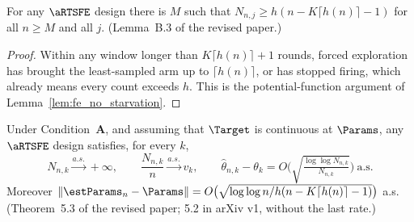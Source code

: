 \begin{lemma}\label{lem:fe_lower_bound}
\leanok
{}
For any $\aRTSFE$ design there is $M$ such that $N_{n,j}\ge h(n-K\lceil h(n)\rceil-1)$ for all
$n\ge M$ and all $j$. (Lemma~B.3 of the revised paper.)
\end{lemma}

\begin{proof}\leanok
Within any window longer than $K\lceil h(n)\rceil+1$ rounds, forced exploration has brought the
least-sampled arm up to $\lceil h(n)\rceil$, or has stopped firing, which already means every
count exceeds $h$. This is the potential-function argument of
Lemma~\ref{lem:fe_no_starvation}.
\end{proof}

\begin{theorem}\label{thm:sparse_rate}
\leanok
{}
Under Condition~\textbf{A}, and assuming that $\Target$ is continuous at $\Params$, any $\aRTSFE$
design satisfies, for every $k$,
\[
  N_{n,k}\xrightarrow{a.s.}+\infty,\qquad
  \frac{N_{n,k}}{n}\xrightarrow{a.s.}v_k,\qquad
  \hat\theta_{n,k}-\theta_k = O\!\Big(\sqrt{\tfrac{\log\log N_{n,k}}{N_{n,k}}}\Big)\ \text{a.s.}
\]
Moreover $\|\estParams_n-\Params\| = O\big(\sqrt{\log\log n / h(n-K\lceil h(n)\rceil-1)}\big)$ a.s.
(Theorem~5.3 of the revised paper; 5.2 in arXiv v1, without the last rate.)
\end{theorem}


